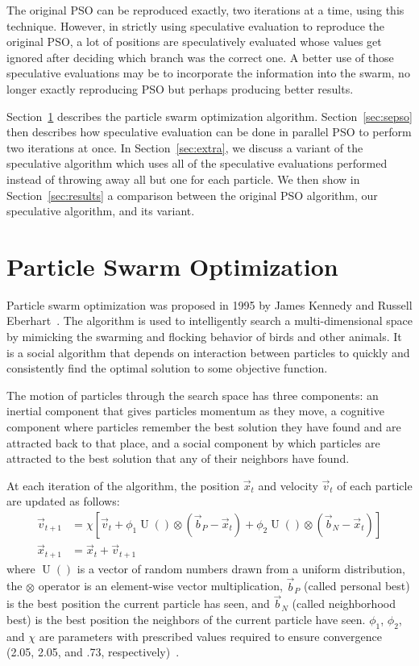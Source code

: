 \documentclass[conference,letterpaper]{IEEEtran}
\renewcommand{\sec}[1]{Section~\ref{sec:#1}}
\DeclareMathOperator{\URand}{U}
\providecommand{\ppos}{\ensuremath{\Vec{x}}}
\providecommand{\pvel}{\ensuremath{\Vec{v}}}
\providecommand{\nbest}{\ensuremath{\Vec{b}_N}}
\providecommand{\pbest}{\ensuremath{\Vec{b}_P}}
\providecommand{\constriction}{\ensuremath{\chi}}
\providecommand{\coeff}{\ensuremath{\phi}}
\begin{document}
The original PSO can be reproduced exactly, two iterations at a time, using
this technique.  However, in strictly using speculative evaluation to reproduce
the original PSO, a lot of positions are speculatively evaluated whose values
get ignored after deciding which branch was the correct one.  A better use of
those speculative evaluations may be to incorporate the information into the
swarm, no longer exactly reproducing PSO but perhaps producing better results.

\sec{pso} describes the particle swarm optimization algorithm.  \sec{sepso}
then describes how speculative evaluation can be done in parallel PSO to
perform two iterations at once.  In \sec{extra}, we discuss a variant of the
speculative algorithm which uses all of the speculative evaluations performed
instead of throwing away all but one for each particle.  We then show in
\sec{results} a comparison between the original PSO algorithm, our speculative
algorithm, and its variant.

\section{Particle Swarm Optimization}
\label{sec:pso}

Particle swarm optimization was proposed in 1995 by James Kennedy and Russell
Eberhart~\cite{kennedy-icnn95}.  The algorithm is used to intelligently search
a multi-dimensional space by mimicking the swarming and flocking behavior of
birds and other animals. It is a social algorithm that depends on interaction
between particles to quickly and consistently find the optimal solution to some
objective function.

The motion of particles through the search space has three components: an
inertial component that gives particles momentum as they move, a cognitive
component where particles remember the best solution they have found and are
attracted back to that place, and a social component by which particles are
attracted to the best solution that any of their neighbors have found.

At each iteration of the algorithm, the position $\ppos_t$ and velocity
$\pvel_t$ of each particle are updated as follows:
\begin{align}
\label{eq:velupdate}
	\pvel_{t+1} &=
		\constriction \left[ \pvel_t +
			\coeff_1\URand()\otimes(\pbest - \ppos_t) +
			\coeff_2\URand()\otimes(\nbest - \ppos_t)
		\right] \\
\label{eq:posupdate}
	\ppos_{t+1} &= \ppos_t + \pvel_{t+1}
\end{align}
where \( \URand() \) is a vector of random numbers drawn from a uniform
distribution, the \( \otimes \) operator is an element-wise vector
multiplication, $\pbest$ (called personal best) is the best position the
current particle has seen, and $\nbest$ (called neighborhood best) is the best
position the neighbors of the current particle have seen.  \( \coeff_1 \), \(
\coeff_2 \), and \( \constriction \) are parameters with prescribed values
required to ensure convergence (2.05, 2.05, and .73,
respectively)~\cite{clerc-tec02}.
\end{document}
